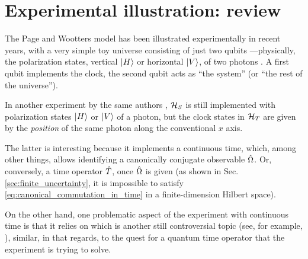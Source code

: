 \section{Experimental illustration: review}
\label{sec:pw:qubit}\label{sec:pw:apps_first}


The Page and Wootters model has been illustrated experimentally in recent years,
with a very simple toy universe consisting of just two qubits
---physically, the polarization states,
vertical $\ket{H}$ or horizontal $\ket{V}$,
of two photons \parencite{Moreva:synthetic,Moreva:illustration}.
A first qubit implements the clock, the second qubit acts as ``the system'' (or
``the rest of the universe'').

In another experiment by the same authors \parencite{Moreva_position}, $\mathcal{H}_S$ is still
implemented with 
polarization states $\ket{H}$ or $\ket{V}$ of a photon, but the clock states in $\mathcal{H}_T$
are given by the \emph{position} of the same photon along the conventional $x$ axis.

The latter is interesting because it implements a continuous time,
which, among other things, allows identifying a canonically conjugate observable
$\hat{\Omega}$. Or, conversely, a time operator $\hat{T}$, once $\hat{\Omega}$ is given
(as shown in Sec. \ref{sec:finite_uncertainty}, it is impossible to satisfy \eqref{eq:canonical_commutation_in_time}
in a finite-dimension Hilbert space).

On the other hand, one problematic aspect of the experiment with continuous time
is that
it relies on  which is another
still controversial topic (see, for example, \cite{HawtonPhotonPosition}),
similar, in that regards, to the quest for a quantum time operator that the experiment is trying to solve.



